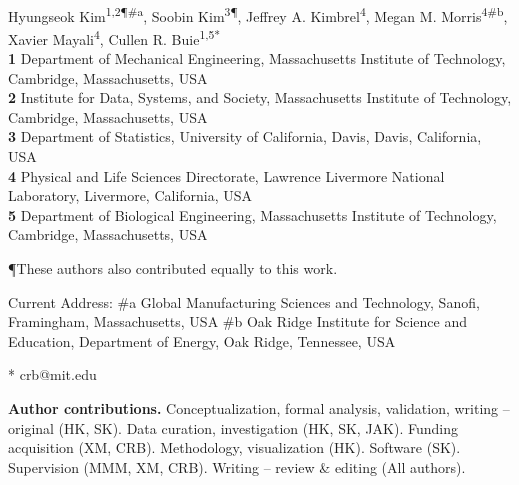 \documentclass[10pt,letterpaper]{article}
\newcommand{\1}{{\rm 1}\kern-0.24em{\rm I}}
\begin{document}
\vspace*{0.2in}

\begin{flushleft}
{\Large
\textbf{}
}
\newline
\\
Hyungseok Kim\textsuperscript{1,2\P \#\!a},
Soobin Kim\textsuperscript{3\P},
Jeffrey A. Kimbrel\textsuperscript{4},
Megan M. Morris\textsuperscript{4\#\!b},
Xavier Mayali\textsuperscript{4},
Cullen R. Buie\textsuperscript{1,5*}
\\
\bigskip
\textbf{1} Department of Mechanical Engineering, Massachusetts Institute of Technology, Cambridge, Massachusetts, USA
\\
\textbf{2} Institute for Data, Systems, and Society, Massachusetts Institute of Technology, Cambridge, Massachusetts, USA
\\
\textbf{3} Department of Statistics, University of California, Davis, Davis, California, USA
\\
\textbf{4} Physical and Life Sciences Directorate, Lawrence Livermore National Laboratory, Livermore, California, USA
\\
\textbf{5} Department of Biological Engineering, Massachusetts Institute of Technology, Cambridge, Massachusetts, USA
\\
\bigskip

\P These authors also contributed equally to this work.

Current Address: \#\!a Global Manufacturing Sciences and Technology, Sanofi, Framingham, Massachusetts, USA
\#\!b Oak Ridge Institute for Science and Education, Department of Energy, Oak Ridge, Tennessee, USA 

* crb@mit.edu

\textbf{Author contributions.} Conceptualization, formal analysis, validation, writing – original (HK, SK). Data curation, investigation (HK, SK, JAK). Funding acquisition (XM, CRB). Methodology, visualization (HK). Software (SK). Supervision (MMM, XM, CRB).  Writing – review \& editing (All authors).

\end{flushleft}
\end{document}
